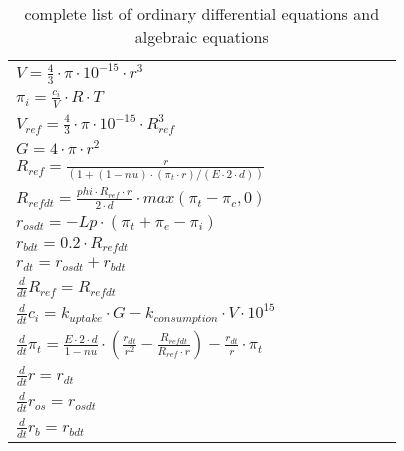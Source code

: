 \begin{table} [h]
	
	\begin{center} 
		\caption{complete list of ordinary differential equations and algebraic equations}
		\begin{tabular} {l l l l l l l l}
			\hline
			$V = \frac{4}{3}\cdot \pi  \cdot 10^{-15} \cdot r^3$ \\
			$\pi_i = \frac{c_i}{V} \cdot R\cdot T$\\
			$V_{ref} =  \frac{4}{3} \cdot \pi \cdot 10^{-15} \cdot R_{ref}^3$\\
			$G = 4 \cdot  \pi \cdot r^2$\\
			$R_{ref} = \frac{r}{(1 + (1 - nu)\cdot (\pi_t \cdot r) / (E\cdot 2\cdot d))} $\\
			$R_{refdt}= \frac{phi\cdot R_{ref}\cdot r }{2\cdot d} \cdot max(\pi_t- \pi_c, 0)$\\
			$r_{osdt }= - Lp\cdot (\pi_t + \pi_e - \pi_i)$\\
			$r_{bdt} = 0.2\cdot R_{refdt}$\\
			$r_{dt} = r_{osdt} + r_{bdt}$  \\
			$\frac{d}{dt} R_{ref} = R_{refdt}$\\
			$\frac{d}{dt}  c_i = k_{uptake}\cdot G - k_{consumption}\cdot V\cdot 10^{15}$\\
			$\frac{d}{dt} \pi_t = \frac{E\cdot 2\cdot d }{1 - nu} \cdot (\frac{r_{dt}}{r^2 } - \frac{R_{refdt}}{R_{ref} \cdot r}) - \frac{r_{dt}}{ r} \cdot \pi_t$\\
			$\frac{d}{dt}  r = r_{dt}$\\
			$\frac{d}{dt} r_{os} = r_{osdt}$\\
			$\frac{d}{dt}  r_b = r_{bdt}$\\
			
			\hline
		\end{tabular}
		\label{equationsVolume}
	\end{center}
\end{table}


